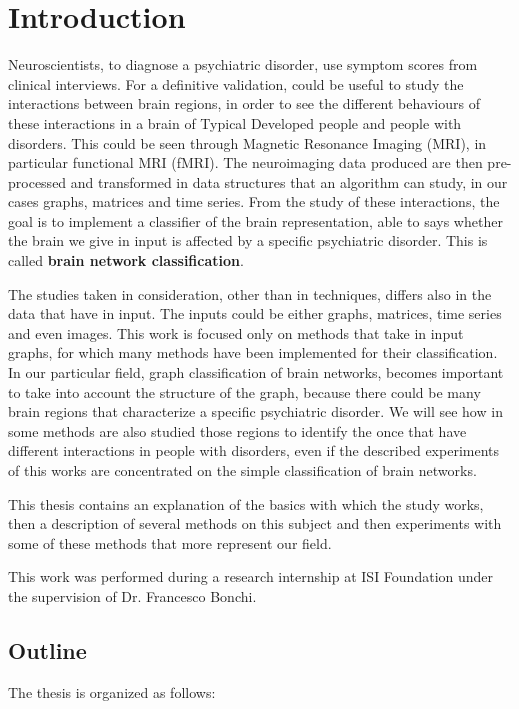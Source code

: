 \chapter{Introduction}
\label{chap:1}

Neuroscientists, to diagnose a psychiatric disorder, use symptom scores from clinical interviews. For a definitive validation, could be useful to study the interactions between brain regions, in order to see the different behaviours of these interactions in a brain of Typical Developed people and people with disorders. This could be seen through Magnetic Resonance Imaging (MRI), in particular functional MRI (fMRI). The neuroimaging data produced are then pre-processed and transformed in data structures that an algorithm can study, in our cases graphs, matrices and time series. From the study of these interactions, the goal is to implement a classifier of the brain representation, able to says whether the brain we give in input is affected by a specific psychiatric disorder. This is called\textbf{ brain network classification}. 

The studies taken in consideration, other than in techniques, differs also in the data that have in input. The inputs could be either graphs, matrices, time series and even images. This work is focused only on methods that take in input graphs, for which many methods have been implemented for their classification. In our particular field, graph classification of brain networks, becomes important to take into account the structure of the graph, because there could be many brain regions that characterize a specific psychiatric disorder. We will see how in some methods are also studied those regions to identify the once that have different interactions in people with disorders, even if the described experiments of this works are concentrated on the simple classification of brain networks. 

This thesis contains an explanation of the basics with which the study works, then a description of several methods on this subject and then experiments with some of these methods that more represent our field. 

This work was performed during a research internship at ISI Foundation
under the supervision of Dr. Francesco Bonchi.

\section{Outline}
The thesis is organized as follows:

